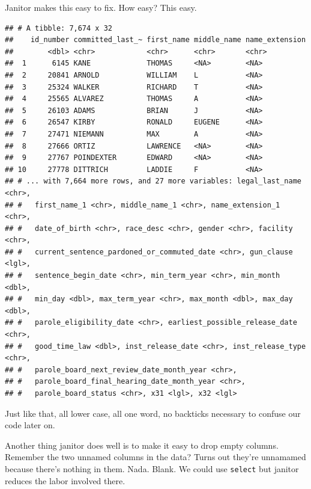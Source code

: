 \documentclass[]{book}
\newenvironment{Shaded}{\begin{snugshade}}{\end{snugshade}}
\newcommand{\KeywordTok}[1]{\textcolor[rgb]{0.13,0.29,0.53}{\textbf{#1}}}
\newcommand{\NormalTok}[1]{#1}
\newcommand{\OperatorTok}[1]{\textcolor[rgb]{0.81,0.36,0.00}{\textbf{#1}}}
\newcommand{\StringTok}[1]{\textcolor[rgb]{0.31,0.60,0.02}{#1}}
\begin{document}
Janitor makes this easy to fix. How easy? This easy.

\begin{Shaded}
\end{Shaded}

\begin{verbatim}
## # A tibble: 7,674 x 32
##    id_number committed_last_~ first_name middle_name name_extension
##        <dbl> <chr>            <chr>      <chr>       <chr>         
##  1      6145 KANE             THOMAS     <NA>        <NA>          
##  2     20841 ARNOLD           WILLIAM    L           <NA>          
##  3     25324 WALKER           RICHARD    T           <NA>          
##  4     25565 ALVAREZ          THOMAS     A           <NA>          
##  5     26103 ADAMS            BRIAN      J           <NA>          
##  6     26547 KIRBY            RONALD     EUGENE      <NA>          
##  7     27471 NIEMANN          MAX        A           <NA>          
##  8     27666 ORTIZ            LAWRENCE   <NA>        <NA>          
##  9     27767 POINDEXTER       EDWARD     <NA>        <NA>          
## 10     27778 DITTRICH         LADDIE     F           <NA>          
## # ... with 7,664 more rows, and 27 more variables: legal_last_name <chr>,
## #   first_name_1 <chr>, middle_name_1 <chr>, name_extension_1 <chr>,
## #   date_of_birth <chr>, race_desc <chr>, gender <chr>, facility <chr>,
## #   current_sentence_pardoned_or_commuted_date <chr>, gun_clause <lgl>,
## #   sentence_begin_date <chr>, min_term_year <chr>, min_month <dbl>,
## #   min_day <dbl>, max_term_year <chr>, max_month <dbl>, max_day <dbl>,
## #   parole_eligibility_date <chr>, earliest_possible_release_date <chr>,
## #   good_time_law <dbl>, inst_release_date <chr>, inst_release_type <chr>,
## #   parole_board_next_review_date_month_year <chr>,
## #   parole_board_final_hearing_date_month_year <chr>,
## #   parole_board_status <chr>, x31 <lgl>, x32 <lgl>
\end{verbatim}

Just like that, all lower case, all one word, no backticks necessary to confuse our code later on.

Another thing janitor does well is to make it easy to drop empty columns. Remember the two unnamed columns in the data? Turns out they're unnamamed because there's nothing in them. Nada. Blank. We could use \texttt{select} but janitor reduces the labor involved there.
\end{document}
